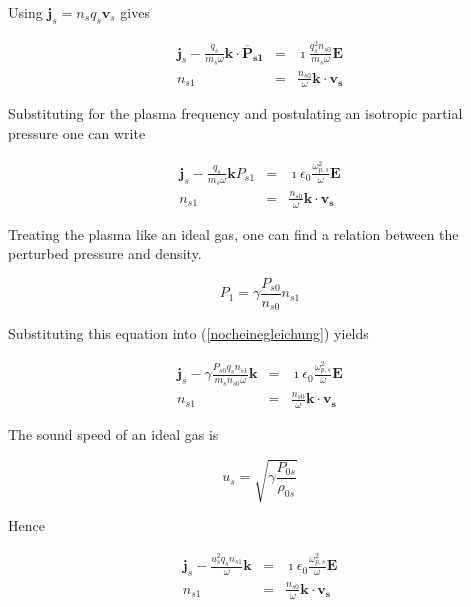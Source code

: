 \documentclass[a4paper,11pt]{thesis}
\begin{document}
Using $\mathbf{j}_s=n_s q_s \mathbf{v}_s$ gives

\begin{eqnarray}
      \mathbf{j}_s  -  \frac{q_s}{ m_s \omega} \mathbf{k} \cdot
     \mathbf{\overline{P}_{s1}} &=& \imath \frac{q_s^2 n_{s0}}{ m_s \omega} \mathbf{E}\\
      n_{s1} &=&   \frac{n_{s0}}{\omega} \mathbf{k} \cdot  \mathbf{v_s}
\end{eqnarray}

Substituting for the plasma frequency and postulating an isotropic partial pressure one can write

\begin{eqnarray}
      \mathbf{j}_s  -  \frac{q_s}{ m_s \omega} \mathbf{k}
     P_{s1} &=& \imath \epsilon_0 \frac{\omega_{p,s}^2}{  \omega} \mathbf{E}\label{nocheinegleichung}\\
      n_{s1} &=&   \frac{n_{s0}}{\omega} \mathbf{k} \cdot  \mathbf{v_s}
\end{eqnarray}


Treating the plasma like an ideal gas, one can find a relation between the perturbed pressure and density.

\begin{equation}
    P_1 = \gamma \frac{P_{s0}}{n_{s0}}n_{s1}
\end{equation}

Substituting this equation into (\ref{nocheinegleichung}) yields


\begin{eqnarray}
      \mathbf{j}_s  -  \gamma \frac{P_{s0} q_s n_{s1}}{ m_s n_{s0} \omega} \mathbf{k}
     &=& \imath \epsilon_0 \frac{\omega_{p,s}^2}{  \omega} \mathbf{E}\\
      n_{s1} &=&   \frac{n_{s0}}{\omega} \mathbf{k} \cdot  \mathbf{v_s}
\end{eqnarray}

The sound speed of an ideal gas is

\begin{equation}
    u_s=\sqrt{\gamma\frac{P_{0s}}{\rho_{0s}}}
\end{equation}

Hence


\begin{eqnarray}
      \mathbf{j}_s  -  \frac{u_s^2 q_s n_{s1}}{  \omega} \mathbf{k}
     &=& \imath \epsilon_0 \frac{\omega_{p,s}^2}{  \omega} \mathbf{E}\\
      n_{s1} &=&   \frac{n_{s0}}{\omega} \mathbf{k} \cdot  \mathbf{v_s}
\end{eqnarray}
\end{document}
